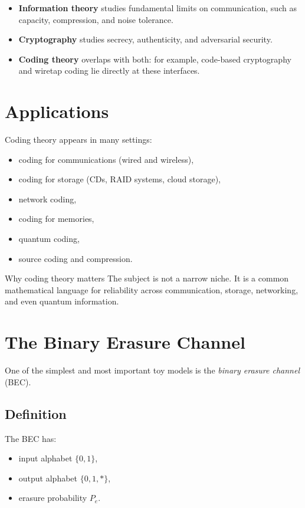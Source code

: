 \documentclass[11pt]{article}
\begin{document}
\begin{itemize}[leftmargin=2em]
  \item \textbf{Information theory} studies fundamental limits on communication, such as
  capacity, compression, and noise tolerance.
  \item \textbf{Cryptography} studies secrecy, authenticity, and adversarial security.
  \item \textbf{Coding theory} overlaps with both: for example, code-based cryptography and
  wiretap coding lie directly at these interfaces.
\end{itemize}

\section{Applications}

Coding theory appears in many settings:

\begin{itemize}[leftmargin=2em]
  \item coding for communications (wired and wireless),
  \item coding for storage (CDs, RAID systems, cloud storage),
  \item network coding,
  \item coding for memories,
  \item quantum coding,
  \item source coding and compression.
\end{itemize}

\begin{summarybox}{Why coding theory matters}
The subject is not a narrow niche. It is a common mathematical language for reliability
across communication, storage, networking, and even quantum information.
\end{summarybox}

\section{The Binary Erasure Channel}

One of the simplest and most important toy models is the \emph{binary erasure channel}
(BEC).

\subsection{Definition}

The BEC has:
\begin{itemize}[leftmargin=2em]
  \item input alphabet $\{0,1\}$,
  \item output alphabet $\{0,1,\ast\}$,
  \item erasure probability $P_e$.
\end{itemize}
\end{document}
